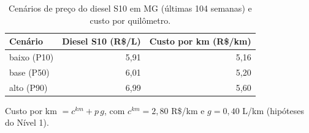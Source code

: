 \begin{table}[htbp]
\centering
\small
\caption{Cenários de preço do diesel S10 em MG (últimas 104 semanas) e custo por quilômetro.}
\label{tab:diesel}
\begin{tabular}{lrr}
\toprule
Cenário & Diesel S10 (R\$/L) & Custo por km (R\$/km) \\
\midrule
baixo (P10) & 5,91 & 5,16 \\
base (P50) & 6,01 & 5,20 \\
alto (P90) & 6,99 & 5,60 \\
\bottomrule
\end{tabular}
\par\smallskip\footnotesize\raggedright Custo por km $= c^{km} + p\,g$, com $c^{km} = 2,80$ R\$/km e $g = 0,40$ L/km (hipóteses do Nível 1).
\end{table}
